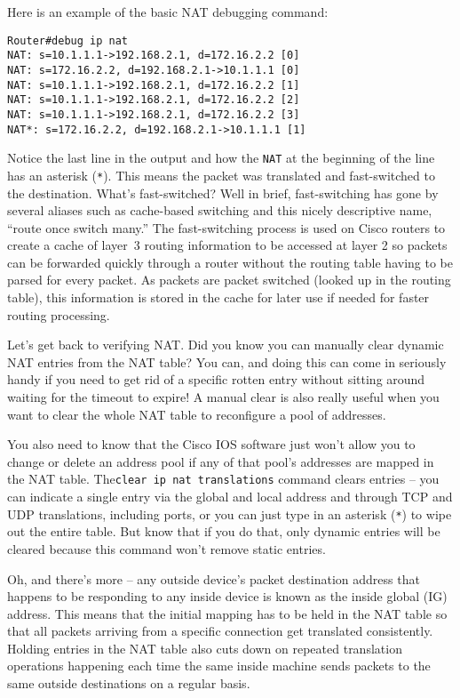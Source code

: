 Here is an example of
the basic NAT debugging command:

\begin{verbatim}
Router#debug ip nat
NAT: s=10.1.1.1->192.168.2.1, d=172.16.2.2 [0]
NAT: s=172.16.2.2, d=192.168.2.1->10.1.1.1 [0]
NAT: s=10.1.1.1->192.168.2.1, d=172.16.2.2 [1]
NAT: s=10.1.1.1->192.168.2.1, d=172.16.2.2 [2]
NAT: s=10.1.1.1->192.168.2.1, d=172.16.2.2 [3]
NAT*: s=172.16.2.2, d=192.168.2.1->10.1.1.1 [1]
\end{verbatim}

Notice the last line in the output and how the \texttt{NAT} at the
beginning of the line has an asterisk (\texttt{*}). This means the
packet was translated and fast-switched to the destination. What's
fast-switched? Well in brief, fast-switching has gone by several aliases
such as cache-based switching and this nicely descriptive name, ``route
once switch many.'' The fast-switching process is used on Cisco routers
to create a cache of layer~3 routing information to be accessed at layer
2 so packets can be forwarded quickly through a router without the
routing table having to be parsed for every packet. As packets are
packet switched (looked up in the routing table), this information is
stored in the cache for later use if needed for faster routing
processing.

Let's get back to verifying NAT. Did you know you can manually clear
dynamic NAT entries from the NAT table? You can, and doing this can come
in seriously handy if you need to get rid of a specific rotten entry
without sitting around waiting for the timeout to expire! A manual clear
is also really useful when you want to clear the whole NAT table to
reconfigure a pool of addresses.

You also need to know that the Cisco IOS software just won't allow you
to change or delete an address pool if any of that pool's addresses are
mapped in the NAT table. The\texttt{clear\ ip\ nat\ translations}
command clears entries -- you can indicate a single entry via the global
and local address and through TCP and UDP translations, including ports,
or you can just type in an asterisk (\texttt{*}) to wipe out the entire
table. But know that if you do that, only dynamic entries will be
cleared because this command won't remove static entries.

Oh, and there's more -- any outside device's packet destination address
that happens to be responding to any inside device is known as the
inside global (IG) address. This means that the initial mapping has to
be held in the NAT table so that all packets arriving from a specific
connection get translated consistently. Holding entries in the NAT table
also cuts down on repeated translation operations happening each time
the same inside machine sends packets to the same outside destinations
on a regular basis.

